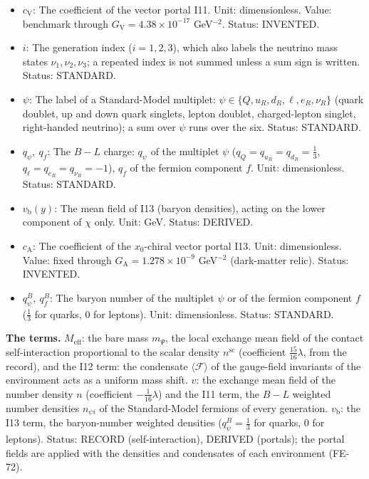 \documentclass[
  10pt,
]{article}
\begin{document}
\begin{itemize}
  density of the Standard-Model fermion \(\psi_i\) (per proper 7-volume
  of eight dimensions); \(n_f\) the density of the fermion component
  \(f\) and \(n_i\) that of the neutrino mass state \(i\) (per 3-volume
  of four dimensions). Unit: \(\mathrm{GeV}^{7}\) (eight dimensions),
  \(\mathrm{GeV}^{3}\) (four dimensions). Status: STANDARD.
\item
  \(c_{\mathrm{V}}\): The coefficient of the vector portal I11. Unit:
  dimensionless. Value: benchmark through
  \(G_{\mathrm{V}} = 4.38\times10^{-17}\) GeV\(^{-2}\). Status:
  INVENTED.
\item
  \(i\): The generation index (\(i = 1, 2, 3\)), which also labels the
  neutrino mass states \(\nu_1, \nu_2, \nu_3\); a repeated index is not
  summed unless a sum sign is written. Status: STANDARD.
\item
  \(\psi\): The label of a Standard-Model multiplet:
  \(\psi \in \{Q, u_R, d_R, \ell, e_R, \nu_R\}\) (quark doublet, up and
  down quark singlets, lepton doublet, charged-lepton singlet,
  right-handed neutrino); a sum over \(\psi\) runs over the six. Status:
  STANDARD.
\item
  \(q_\psi,\ q_f\): The \(B - L\) charge: \(q_\psi\) of the multiplet
  \(\psi\) (\(q_Q = q_{u_R} = q_{d_R} = \frac13\),
  \(q_\ell = q_{e_R} = q_{\nu_R} = -1\)), \(q_f\) of the fermion
  component \(f\). Unit: dimensionless. Status: STANDARD.
\item
  \(v_{\mathrm{b}}(y)\): The mean field of I13 (baryon densities),
  acting on the lower component of \(\chi\) only. Unit: GeV. Status:
  DERIVED.
\item
  \(c_{\mathrm{A}}\): The coefficient of the \(x_0\)-chiral vector
  portal I13. Unit: dimensionless. Value: fixed through
  \(G_{\mathrm{A}} = 1.278\times10^{-9}\) GeV\(^{-2}\) (dark-matter
  relic). Status: INVENTED.
\item
  \(q^B_\psi,\ q^B_f\): The baryon number of the multiplet \(\psi\) or
  of the fermion component \(f\) (\(\frac13\) for quarks, 0 for
  leptons). Unit: dimensionless. Status: STANDARD.
\end{itemize}

\textbf{The terms.} \(M_{\mathrm{eff}}\): the bare mass \(m_\Psi\), the
local exchange mean field of the contact self-interaction proportional
to the scalar density \(n^{\mathrm{sc}}\) (coefficient
\(\frac{15}{16}\lambda\), from the record), and the I12 term: the
condensate \(\langle\mathcal{F}\rangle\) of the gauge-field invariants
of the environment acts as a uniform mass shift. \(v\): the exchange
mean field of the number density \(n\) (coefficient
\(-\frac{1}{16}\lambda\)) and the I11 term, the \(B - L\) weighted
number densities \(n_{\psi i}\) of the Standard-Model fermions of every
generation. \(v_{\mathrm{b}}\): the I13 term, the baryon-number weighted
densities (\(q^B_\psi = \frac13\) for quarks, 0 for leptons). Status:
RECORD (self-interaction), DERIVED (portals); the portal fields are
applied with the densities and condensates of each environment (FE-72).
\end{document}
